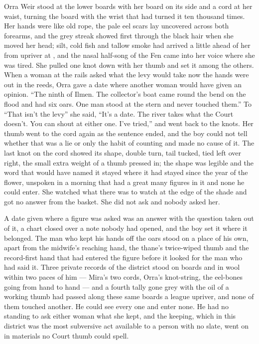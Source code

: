 Orra Weir stood at the lower boards with her board on its side and a cord at her waist, turning the board with the wrist that had turned it ten thousand times. Her hands were like old rope, the pale eel scars lay uncovered across both forearms, and the grey streak showed first through the black hair when she moved her head; silt, cold fish and tallow smoke had arrived a little ahead of her from upriver at , and the nasal half-song of the Fen came into her voice where she was tired. She pulled one knot down with her thumb and set it among the others. When a woman at the rails asked what the levy would take now the hands were out in the reeds, Orra gave a date where another woman would have given an opinion. “The ninth of Ilmen. The collector's boat came round the bend on the flood and had six oars. One man stood at the stern and never touched them.” To “That isn't the levy” she said, “It's a date. The river takes what the Court doesn't. You can shout at either one. I've tried,” and went back to the knots. Her thumb went to the cord again as the sentence ended, and the boy could not tell whether that was a lie or only the habit of counting and made no cause of it. The last knot on the cord showed its shape, double turn, tail tucked, tied left over right, the small extra weight of a thumb pressed in; the shape was legible and the word that would have named it stayed where it had stayed since the year of the flower, unspoken in a morning that had a great many figures in it and none he could enter. She watched what there was to watch at the edge of the shade and got no answer from the basket. She did not ask and nobody asked her.

A date given where a figure was asked was an answer with the question taken out of it, a chart closed over a note nobody had opened, and the boy set it where it belonged. The man who kept his hands off the oars stood on a place of his own, apart from the midwife's reaching hand, the thane's twice-wiped thumb and the record-first hand that had entered the figure before it looked for the man who had said it. Three private records of the district stood on boards and in wool within two paces of him --- Mira's two cords, Orra's knot-string, the eel-bones going from hand to hand --- and a fourth tally gone grey with the oil of a working thumb had passed along these same boards a league upriver, and none of them touched another. He could see every one and enter none. He had no standing to ask either woman what she kept, and the keeping, which in this district was the most subversive act available to a person with no slate, went on in materials no Court thumb could spell.

